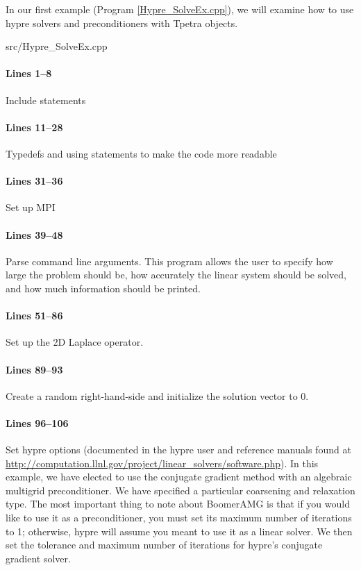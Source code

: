 In our first example (Program \ref{Hypre_SolveEx.cpp}), we will examine how
to use hypre solvers and preconditioners with Tpetra objects.

\begin{lstinputlisting}[caption=Hypre\_SolveEx.cpp,label=Hypre_SolveEx.cpp]{src/Hypre_SolveEx.cpp}
\end{lstinputlisting}

\paragraph{Lines 1--8}
Include statements

\paragraph{Lines 11--28}
Typedefs and using statements to make the code more readable

\paragraph{Lines 31--36}
Set up MPI

\paragraph{Lines 39--48}
Parse command line arguments.  This program allows the user to specify how large
the problem should be, how accurately the linear system should be solved, and
how much information should be printed.

\paragraph{Lines 51--86}
Set up the 2D Laplace operator.

\paragraph{Lines 89--93}
Create a random right-hand-side and initialize the solution vector to 0.

\paragraph{Lines 96--106}
Set hypre options (documented in the hypre user and reference manuals found at
\url{http://computation.llnl.gov/project/linear_solvers/software.php}). In this
example, we have elected to use the conjugate gradient method with an algebraic
multigrid preconditioner.  We have specified a particular coarsening and
relaxation type.  The most important thing to note about BoomerAMG is that if
you would like to use it as a preconditioner, you must set its maximum number of
iterations to 1; otherwise, hypre will assume you meant to use it as a linear
solver.  We then set the tolerance and maximum number of iterations for hypre's
conjugate gradient solver.

